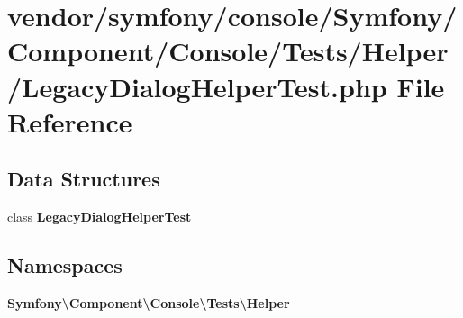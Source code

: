 \section{vendor/symfony/console/\+Symfony/\+Component/\+Console/\+Tests/\+Helper/\+Legacy\+Dialog\+Helper\+Test.php File Reference}
\label{_legacy_dialog_helper_test_8php}
\subsection*{Data Structures}
\begin{DoxyCompactItemize}
\item 
class {\bf Legacy\+Dialog\+Helper\+Test}
\end{DoxyCompactItemize}
\subsection*{Namespaces}
\begin{DoxyCompactItemize}
\item 
 {\bf Symfony\textbackslash{}\+Component\textbackslash{}\+Console\textbackslash{}\+Tests\textbackslash{}\+Helper}
\end{DoxyCompactItemize}
